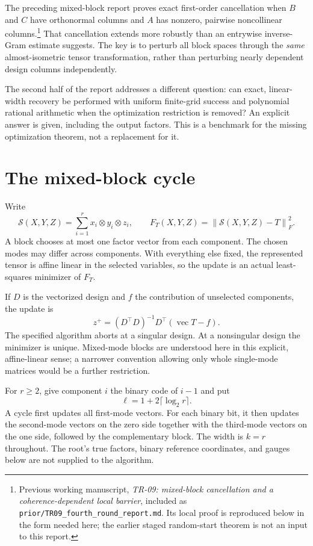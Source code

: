 \documentclass[11pt]{article}
\theoremstyle{remark}\newtheorem{remark}[theorem]{Remark}
\newcommand{\norm}[1]{\left\lVert#1\right\rVert}
\newcommand{\Smap}{\mathcal S}
\begin{document}
The preceding mixed-block report proves exact first-order cancellation when $B$ and $C$ have orthonormal columns and $A$ has nonzero, pairwise noncollinear columns.\footnote{Previous working manuscript, \emph{TR-09: mixed-block cancellation and a coherence-dependent local barrier}, included as \texttt{prior/TR09\_fourth\_round\_report.md}. Its local proof is reproduced below in the form needed here; the earlier staged random-start theorem is not an input to this report.} That cancellation extends more robustly than an entrywise inverse-Gram estimate suggests. The key is to perturb all block spaces through the \emph{same} almost-isometric tensor transformation, rather than perturbing nearly dependent design columns independently.

The second half of the report addresses a different question: can exact, linear-width recovery be performed with uniform finite-grid success and polynomial rational arithmetic when the optimization restriction is removed? An explicit answer is given, including the output factors. This is a benchmark for the missing optimization theorem, not a replacement for it.

\section{The mixed-block cycle}
Write
\[
 \Smap(X,Y,Z)=\sum_{i=1}^r x_i\otimes y_i\otimes z_i,
 \qquad F_T(X,Y,Z)=\norm{\Smap(X,Y,Z)-T}_F^2.
\]
A block chooses at most one factor vector from each component. The chosen modes may differ across components. With everything else fixed, the represented tensor is affine linear in the selected variables, so the update is an actual least-squares minimizer of $F_T$.

If $D$ is the vectorized design and $f$ the contribution of unselected components, the update is
\begin{equation}\label{eq:block}
 z^+=(D^\top D)^{-1}D^\top(\operatorname{vec}T-f).
\end{equation}
The specified algorithm aborts at a singular design. At a nonsingular design the minimizer is unique. Mixed-mode blocks are understood here in this explicit, affine-linear sense; a narrower convention allowing only whole single-mode matrices would be a further restriction.

For $r\ge2$, give component $i$ the binary code of $i-1$ and put
\begin{equation}\label{eq:length}
 \ell=1+2\lceil\log_2 r\rceil.
\end{equation}
A cycle first updates all first-mode vectors. For each binary bit, it then updates the second-mode vectors on the zero side together with the third-mode vectors on the one side, followed by the complementary block. The width is $k=r$ throughout. The root's true factors, binary reference coordinates, and gauges below are not supplied to the algorithm.
\end{document}
